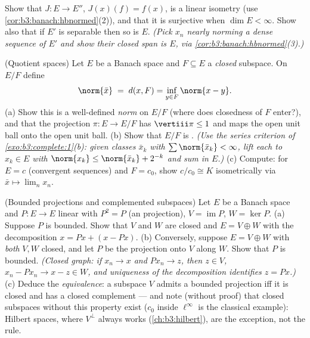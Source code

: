 \begin{exercise}[$\star\star$]\label{exo:b3:banach:10}
Show that $J \colon E \to E''$, $J(x)(f) = f(x)$, is a linear
isometry (use \cref{cor:b3:banach:hbnormed}(2)), and that it is
surjective when $\dim E < \infty$. Show also that if $E'$ is
separable then so is $E$. \emph{(Pick $x_n$ nearly norming a
dense sequence of $E'$ and show their closed span is $E$, via
\cref{cor:b3:banach:hbnormed}(3).)}
\end{exercise}

\begin{exercise}[$\star\star$]\label{exo:b3:banach:11}
(Quotient spaces) Let $E$ be a Banach space and $F \subseteq
E$ a \emph{closed} subspace. On $E/F$ define
\[
\norm{\bar x} \;=\; d(x, F) = \inf_{y\in F}\norm{x - y} .
\]
(a) Show this is a well-defined \emph{norm} on $E/F$ (where
does closedness of $F$ enter?), and that the projection $\pi
\colon E \to E/F$ has $\vertiii\pi \leq 1$ and maps the open
unit ball onto the open unit ball.
(b) Show that $E/F$ is . \emph{(Use the series
criterion of \cref{exo:b3:complete:1}(b): given classes
$\bar x_k$ with $\sum\norm{\bar x_k} < \infty$, lift each to
$x_k \in E$ with $\norm{x_k} \leq \norm{\bar x_k} + 2^{-k}$
and sum in $E$.)}
(c) Compute: for $E = c$ (convergent sequences) and $F =
c_0$, show $c/c_0 \cong K$ isometrically via $\bar x \mapsto
\lim_nx_n$.
\end{exercise}

\begin{exercise}[$\star\star$]\label{exo:b3:banach:12}
(Bounded projections and complemented subspaces) Let $E$ be a
Banach space and $P \colon E \to E$ linear with $P^2 = P$
(an  projection), $V = \operatorname{im}P$, $W =
\ker P$.
(a) Suppose $P$ is bounded. Show that $V$ and $W$ are closed
and $E = V \oplus W$ with the decomposition $x = Px + (x -
Px)$.
(b) Conversely, suppose $E = V \oplus W$ with \emph{both} $V,
W$ closed, and let $P$ be the projection onto $V$ along $W$.
Show that $P$ is bounded. \emph{(Closed graph: if $x_n \to x$
and $Px_n \to z$, then $z \in V$, $x_n - Px_n \to x - z \in
W$, and uniqueness of the decomposition identifies $z =
Px$.)}
(c) Deduce the \emph{equivalence}: a subspace $V$ admits a
bounded projection iff it is closed and has a closed
 complement --- and note (without proof) that
closed subspaces without this property exist ($c_0$ inside
$\ell^\infty$ is the classical example): Hilbert spaces,
where $V^\perp$ always works
(\cref{ch:b3:hilbert}), are the exception, not the rule.
\end{exercise}


